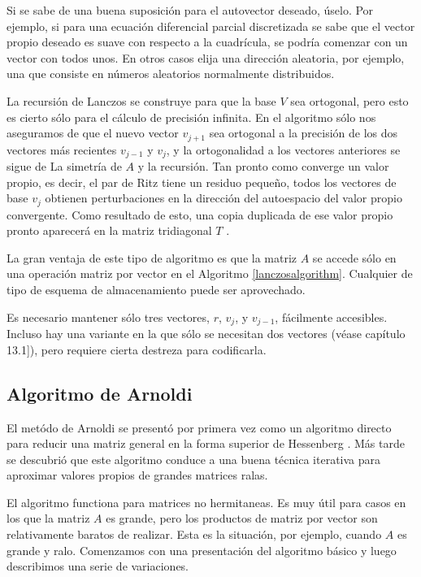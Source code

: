 \documentclass[a4paper,openright,12pt, oneside]{book}
\begin{document}
Si se sabe de una buena suposici\'on para el autovector deseado, \'uselo. Por ejemplo, si para una ecuaci\'on diferencial parcial discretizada se sabe que el vector propio deseado es suave con respecto a la cuadr\'icula, se podr\'ia comenzar con un vector con todos unos. 
En otros casos elija una direcci\'on aleatoria, por ejemplo, una que consiste en n\'umeros aleatorios normalmente distribuidos.

La recursi\'on de Lanczos se construye para que la base $ V $ sea ortogonal, pero esto es cierto s\'olo para el c\'alculo de precisi\'on infinita. En el algoritmo s\'olo nos aseguramos de que el nuevo vector $ v_{j + 1} $ sea ortogonal a la precisi\'on de los dos vectores m\'as recientes $ v_ {j-1} $ y $ v_j $, y la ortogonalidad a los vectores anteriores se sigue de La simetr\'ia de $ A $ y la recursi\'on.
Tan pronto como converge un valor propio, es decir, el par de Ritz tiene un residuo peque\~no, todos los vectores de base $ v_j $ obtienen perturbaciones en la direcci\'on del autoespacio del valor propio convergente. Como resultado de esto, una copia duplicada de ese valor propio pronto aparecer\'a en la matriz tridiagonal $ T $ \cite{Parlett}.

La gran ventaja de este tipo de algoritmo es que la matriz $ A $ se accede s\'olo en una operaci\'on matriz por vector en el Algoritmo \ref{lanczosalgorithm}. Cualquier de tipo de esquema de almacenamiento puede ser aprovechado.

Es necesario mantener s\'olo tres vectores, $ r $, $ v_j $, y $ v_ {j-1} $, f\'acilmente accesibles. Incluso hay una variante en la que s\'olo se necesitan dos vectores (v\'ease \cite{Parlett} cap\'itulo 13.1]), pero requiere cierta destreza para codificarla.

\subsection{Algoritmo de Arnoldi}

El met\'odo de Arnoldi se present\'o por primera vez como un algoritmo directo para reducir una matriz general en la forma superior de Hessenberg \cite{FORMHESS}. M\'as tarde se descubri\'o que este algoritmo conduce a una buena t\'ecnica iterativa para aproximar valores propios de grandes matrices ralas.

El algoritmo functiona para matrices no hermitaneas. Es muy \'util para casos en los que la matriz $\displaystyle A$ es grande, pero los productos de matriz por vector son relativamente baratos de realizar. Esta es la situaci\'on, por ejemplo, cuando $\displaystyle A $ es grande y ralo. Comenzamos con una presentaci\'on del algoritmo b\'asico y luego describimos una serie de variaciones.
\end{document}
